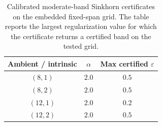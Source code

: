 \begin{table}[!htbp]
\centering
\caption{Calibrated moderate-band Sinkhorn certificates on the embedded
fixed-span grid. The table reports the largest regularization value for which
the certificate returns a certified band on the tested grid.}
\label{tab:sinkhorn_moderate_band_certificate}
\begin{tabular}{ccc}
\toprule
Ambient / intrinsic & $\alpha$ & Max certified $\varepsilon$ \\
\midrule
$(8,1)$  & $2.0$ & $0.5$ \\
$(8,2)$  & $2.0$ & $0.5$ \\
$(12,1)$ & $2.0$ & $0.2$ \\
$(12,2)$ & $2.0$ & $0.5$ \\
\bottomrule
\end{tabular}
\end{table}
